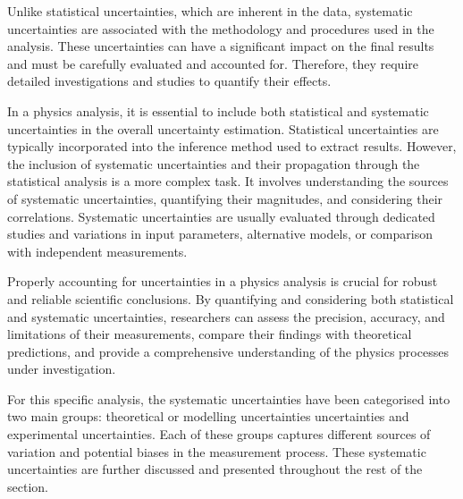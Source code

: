 Unlike statistical uncertainties, which are inherent in the data, systematic uncertainties are associated 
with the methodology and procedures used in the analysis. These uncertainties can have a significant 
impact on the final results and must be carefully evaluated and accounted for. Therefore, they require 
detailed investigations and studies to quantify their effects.

In a physics analysis, it is essential to include both statistical and systematic uncertainties in the overall 
uncertainty estimation. Statistical uncertainties are typically incorporated into the inference method used 
to extract results. However, the inclusion of systematic uncertainties and their propagation through the 
statistical analysis is a more complex task. It involves understanding the sources of systematic 
uncertainties, quantifying their magnitudes, and considering their correlations. Systematic uncertainties 
are usually evaluated through dedicated studies and variations in input parameters, alternative models, 
or comparison with independent measurements.

Properly accounting for uncertainties in a physics analysis is crucial for robust and reliable scientific 
conclusions. By quantifying and considering both statistical and systematic uncertainties, researchers 
can assess the precision, accuracy, and limitations of their measurements, compare their findings with 
theoretical predictions, and provide a comprehensive understanding of the physics processes under 
investigation.



For this specific analysis, the systematic uncertainties have been categorised into two main groups: 
theoretical or modelling uncertainties uncertainties and experimental uncertainties. Each of these groups 
captures different sources of variation and potential biases in the measurement process. These 
systematic uncertainties are further discussed and presented throughout the rest of the section.


